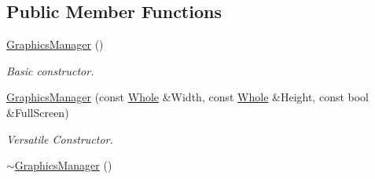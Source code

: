 \subsection*{Public Member Functions}
\begin{DoxyCompactItemize}
\item 
\hyperlink{classphys_1_1GraphicsManager_aceab258136ec2f29c8f163bf270f62c1}{GraphicsManager} ()
\begin{DoxyCompactList}\small\item\em Basic constructor. \item\end{DoxyCompactList}\item 
\hyperlink{classphys_1_1GraphicsManager_a886beb1a86c4d25fde0a2965e464be62}{GraphicsManager} (const \hyperlink{namespacephys_a460f6bc24c8dd347b05e0366ae34f34a}{Whole} \&Width, const \hyperlink{namespacephys_a460f6bc24c8dd347b05e0366ae34f34a}{Whole} \&Height, const bool \&FullScreen)
\begin{DoxyCompactList}\small\item\em Versatile Constructor. \item\end{DoxyCompactList}\item 
\hypertarget{classphys_1_1GraphicsManager_a3a2cb4b7e078faa168025c835062e78f}{
\hyperlink{classphys_1_1GraphicsManager_a3a2cb4b7e078faa168025c835062e78f}{$\sim$GraphicsManager} ()}
\label{dd/d63/classphys_1_1GraphicsManager_a3a2cb4b7e078faa168025c835062e78f}


\end{DoxyCompactItemize}
